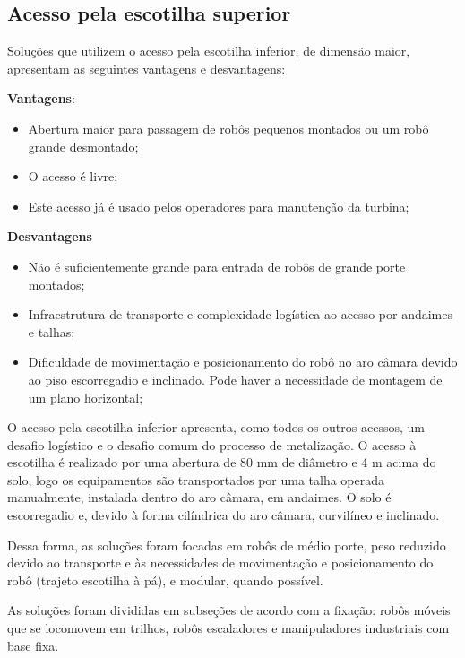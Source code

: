 \subsection{Acesso pela escotilha superior}
Soluções que utilizem o acesso pela escotilha inferior, de dimensão maior,
apresentam as seguintes vantagens e desvantagens:

\textbf{Vantagens}:
\begin{itemize}
  \item Abertura maior para passagem de robôs pequenos montados ou um robô
  grande desmontado;
  \item O acesso é livre;
  \item Este acesso já é usado pelos operadores para manutenção da turbina;
\end{itemize}

\textbf{Desvantagens}
\begin{itemize}
  \item Não é suficientemente grande para entrada de robôs de grande
  porte montados;
  \item Infraestrutura de transporte e complexidade logística ao acesso por
  andaimes e talhas;
  \item Dificuldade de movimentação e posicionamento do robô no aro câmara
  devido ao piso escorregadio e inclinado. Pode haver a necessidade de montagem
  de um plano horizontal; 
\end{itemize}

O acesso pela escotilha inferior apresenta, como todos os outros
acessos, um desafio logístico e o desafio comum do processo de metalização. O
acesso à escotilha é realizado por uma abertura de 80 mm de diâmetro e 4 m acima
do solo, logo os equipamentos são transportados por uma talha operada manualmente,
instalada dentro do aro câmara, em andaimes. O solo é escorregadio e, devido à
forma cilíndrica do aro câmara, curvilíneo e inclinado.

Dessa forma, as soluções foram focadas em robôs de médio porte, peso reduzido
devido ao transporte e às necessidades de movimentação e posicionamento do robô
(trajeto escotilha à pá), e modular, quando possível.

As soluções foram divididas em subseções de acordo com a fixação:
robôs móveis que se locomovem em trilhos, robôs escaladores e manipuladores
industriais com base fixa. 




 
%